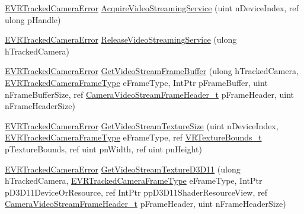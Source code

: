 \begin{DoxyCompactItemize}
\item 
\mbox{\hyperlink{namespace_valve_1_1_v_r_ad0e012e846f5d93848783c044614cfd3}{E\+V\+R\+Tracked\+Camera\+Error}} \mbox{\hyperlink{class_valve_1_1_v_r_1_1_c_v_r_tracked_camera_a088e0575a1a1a133ae56608e4e244e62}{Acquire\+Video\+Streaming\+Service}} (uint n\+Device\+Index, ref ulong p\+Handle)
\item 
\mbox{\hyperlink{namespace_valve_1_1_v_r_ad0e012e846f5d93848783c044614cfd3}{E\+V\+R\+Tracked\+Camera\+Error}} \mbox{\hyperlink{class_valve_1_1_v_r_1_1_c_v_r_tracked_camera_aee0ee9f7e4e1374a87b79139eba5ae2d}{Release\+Video\+Streaming\+Service}} (ulong h\+Tracked\+Camera)
\item 
\mbox{\hyperlink{namespace_valve_1_1_v_r_ad0e012e846f5d93848783c044614cfd3}{E\+V\+R\+Tracked\+Camera\+Error}} \mbox{\hyperlink{class_valve_1_1_v_r_1_1_c_v_r_tracked_camera_ada866b6a0bfbdc3a1a7c3ab399317481}{Get\+Video\+Stream\+Frame\+Buffer}} (ulong h\+Tracked\+Camera, \mbox{\hyperlink{namespace_valve_1_1_v_r_a9962211bc3fe98c2683db188c12c9afd}{E\+V\+R\+Tracked\+Camera\+Frame\+Type}} e\+Frame\+Type, Int\+Ptr p\+Frame\+Buffer, uint n\+Frame\+Buffer\+Size, ref \mbox{\hyperlink{struct_valve_1_1_v_r_1_1_camera_video_stream_frame_header__t}{Camera\+Video\+Stream\+Frame\+Header\+\_\+t}} p\+Frame\+Header, uint n\+Frame\+Header\+Size)
\item 
\mbox{\hyperlink{namespace_valve_1_1_v_r_ad0e012e846f5d93848783c044614cfd3}{E\+V\+R\+Tracked\+Camera\+Error}} \mbox{\hyperlink{class_valve_1_1_v_r_1_1_c_v_r_tracked_camera_a8edfe35e16e786063cf5749899751d8a}{Get\+Video\+Stream\+Texture\+Size}} (uint n\+Device\+Index, \mbox{\hyperlink{namespace_valve_1_1_v_r_a9962211bc3fe98c2683db188c12c9afd}{E\+V\+R\+Tracked\+Camera\+Frame\+Type}} e\+Frame\+Type, ref \mbox{\hyperlink{struct_valve_1_1_v_r_1_1_v_r_texture_bounds__t}{V\+R\+Texture\+Bounds\+\_\+t}} p\+Texture\+Bounds, ref uint pn\+Width, ref uint pn\+Height)
\item 
\mbox{\hyperlink{namespace_valve_1_1_v_r_ad0e012e846f5d93848783c044614cfd3}{E\+V\+R\+Tracked\+Camera\+Error}} \mbox{\hyperlink{class_valve_1_1_v_r_1_1_c_v_r_tracked_camera_a75788ecc02f0d8f2164f01678ff4186a}{Get\+Video\+Stream\+Texture\+D3\+D11}} (ulong h\+Tracked\+Camera, \mbox{\hyperlink{namespace_valve_1_1_v_r_a9962211bc3fe98c2683db188c12c9afd}{E\+V\+R\+Tracked\+Camera\+Frame\+Type}} e\+Frame\+Type, Int\+Ptr p\+D3\+D11\+Device\+Or\+Resource, ref Int\+Ptr pp\+D3\+D11\+Shader\+Resource\+View, ref \mbox{\hyperlink{struct_valve_1_1_v_r_1_1_camera_video_stream_frame_header__t}{Camera\+Video\+Stream\+Frame\+Header\+\_\+t}} p\+Frame\+Header, uint n\+Frame\+Header\+Size)

\end{DoxyCompactItemize}
